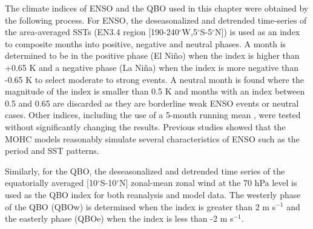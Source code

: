 The climate indices of ENSO and the QBO used in this chapter were obtained by the following process. 
For ENSO, the deseasonalized and detrended time-series of the area-averaged SSTs (EN3.4 region [190-240$^\circ$W,5$^\circ$S-5$^\circ$N]) is used as an index to composite months into positive, negative and neutral phases. 
A month is determined to be in the positive phase (El Niño) when the index is higher than +0.65 K and a negative phase (La Niña) when the index is more negative than -0.65 K to select moderate to strong events. A neutral month is found where the magnitude of the index is smaller than 0.5 K and months with an index between 0.5 and 0.65 are discarded as they are borderline weak ENSO events or neutral cases.  Other indices, including the use of a 5-month running mean \citep{trenberth1998}, were tested without significantly changing the results.   Previous studies \citep[e.g.][]{menary2018,kuhlbrodt2018}  showed that the MOHC models reasonably simulate several characteristics of ENSO such as the period and SST patterns.





Similarly, for the QBO, the deseasonalized and detrended time series of the equatorially averaged [10$^\circ$S-10$^\circ$N] zonal-mean zonal wind at the 70 hPa level is used as the QBO index for both reanalysis and model data. The westerly phase of the QBO (QBOw) is determined when the index is greater than 2 m s$^{-1}$ and the easterly phase (QBOe) when the index is less than -2 m s$^{-1}$. 


